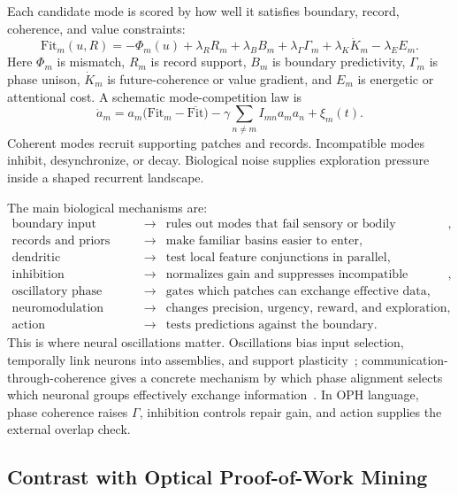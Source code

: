 \documentclass[11pt]{article}
\theoremstyle{remark}
\theoremstyle{plain}
\begin{document}
Each candidate mode is scored by how well it satisfies boundary, record, coherence, and value constraints:
\[
\boxed{
\mathrm{Fit}_m(u,R)
=
-\Phi_m(u)
+\lambda_R R_m
+\lambda_B B_m
+\lambda_\Gamma\Gamma_m
+\lambda_K \dot K_m
-\lambda_E E_m.
}
\]
Here \(\Phi_m\) is mismatch, \(R_m\) is record support, \(B_m\) is boundary predictivity, \(\Gamma_m\) is phase unison, \(\dot K_m\) is future-coherence or value gradient, and \(E_m\) is energetic or attentional cost. A schematic mode-competition law is
\[
\dot a_m
=
a_m\bigl(\mathrm{Fit}_m-\overline{\mathrm{Fit}}\bigr)
-\gamma\sum_{n\ne m}I_{mn}a_ma_n
+\xi_m(t).
\]
Coherent modes recruit supporting patches and records. Incompatible modes inhibit, desynchronize, or decay. Biological noise supplies exploration pressure inside a shaped recurrent landscape.

The main biological mechanisms are:
\[
\begin{array}{rcl}
\text{boundary input} &\to& \text{rules out modes that fail sensory or bodily prediction},\\
\text{records and priors} &\to& \text{make familiar basins easier to enter},\\
\text{dendritic nonlinearities} &\to& \text{test local feature conjunctions in parallel},\\
\text{inhibition} &\to& \text{normalizes gain and suppresses incompatible coalitions},\\
\text{oscillatory phase} &\to& \text{gates which patches can exchange effective data},\\
\text{neuromodulation} &\to& \text{changes precision, urgency, reward, and exploration},\\
\text{action} &\to& \text{tests predictions against the boundary}.
\end{array}
\]
This is where neural oscillations matter. Oscillations bias input selection, temporally link neurons into assemblies, and support plasticity~\cite{BuzsakiDraguhn2004}; communication-through-coherence gives a concrete mechanism by which phase alignment selects which neuronal groups effectively exchange information~\cite{Fries2015}. In OPH language, phase coherence raises \(\Gamma\), inhibition controls repair gain, and action supplies the external overlap check.

\subsection{Contrast with Optical Proof-of-Work Mining}
\end{document}
